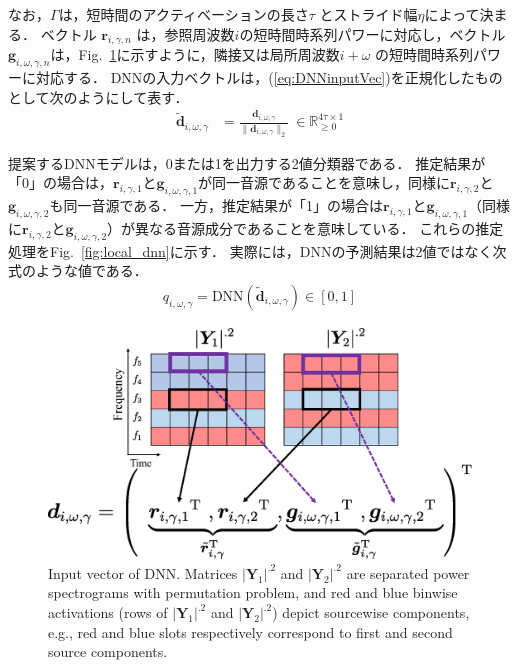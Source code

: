 なお，$\Gamma$は，短時間のアクティベーションの長さ$\tau$ とストライド幅$\eta$によって決まる．
ベクトル $\bm{r}_{i,\gamma,n}$ は，参照周波数$i$の短時間時系列パワーに対応し，ベクトル $\bm{g}_{i,\omega,\gamma,n}$は，Fig.~\ref{fig:input}に示すように，隣接又は局所周波数$i+\omega$ の短時間時系列パワーに対応する．
DNNの入力ベクトルは，(\ref{eq:DNNinputVec})を正規化したものとして次のようにして表す．
\begin{align}
\tilde{\bm{d}}_{i, \omega, \gamma} &=\frac{\bm{d}_{i, \omega, \gamma} }{ \|{\bm{d}_{i, \omega, \gamma} }\|_2}~\in \mathbb{R}_{\geq 0}^{4\tau \times 1}  \label{eq:input}
\end{align}

提案するDNNモデルは，0または1を出力する2値分類器である．
推定結果が「0」の場合は，$\bm{r}_{i,\gamma, 1}$と$\bm{g}_{i,\omega,\gamma, 1}$が同一音源であることを意味し，同様に$\bm{r}_{i,\gamma, 2}$と$\bm{g}_{i,\omega,\gamma, 2}$も同一音源である．
一方，推定結果が「1」の場合は$\bm{r}_{i,\gamma, 1}$と$\bm{g}_{i,\omega,\gamma, 1}$（同様に$\bm{r}_{i,\gamma, 2}$と$\bm{g}_{i,\omega,\gamma, 2}$）が異なる音源成分であることを意味している．
これらの推定処理をFig.~\ref{fig:local_dnn}に示す．
実際には，DNNの予測結果は2値ではなく次式のような値である．
\begin{align}
    q_{i,\omega,\gamma} = \mathrm{DNN}\left(\tilde{\bm{d}}_{i,\omega,\gamma}\right) \in [0, 1]
\end{align}
\begin{figure}[t]
    \begin{center}
        \includegraphics[width=1.0\columnwidth]{figures/dnn_input}
    \end{center}
    \vspace{-8pt}
	\caption{Input vector of DNN. Matrices $|\bm{Y}_1|^{.2}$ and $|\bm{Y}_2|^{.2}$ are separated power spectrograms with permutation problem, and red and blue binwise activations (rows of $|\bm{Y}_1|^{.2}$ and $|\bm{Y}_2|^{.2}$) depict sourcewise components, e.g., red and blue slots respectively correspond to first and second source components.}
	\label{fig:input}
\end{figure}
